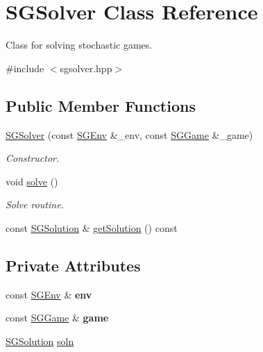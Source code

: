 \hypertarget{classSGSolver}{\section{S\-G\-Solver Class Reference}
\label{classSGSolver}
}


Class for solving stochastic games.  




{\ttfamily \#include $<$sgsolver.\-hpp$>$}

\subsection*{Public Member Functions}
\begin{DoxyCompactItemize}
\item 
\hyperlink{classSGSolver_afb38b33644c2768446f3a247f02dd643}{S\-G\-Solver} (const \hyperlink{classSGEnv}{S\-G\-Env} \&\-\_\-env, const \hyperlink{classSGGame}{S\-G\-Game} \&\-\_\-game)
\begin{DoxyCompactList}\small\item\em Constructor. \end{DoxyCompactList}\item 
void \hyperlink{classSGSolver_a220dd431eabdd9ff8419fafb28b7b990}{solve} ()
\begin{DoxyCompactList}\small\item\em Solve routine. \end{DoxyCompactList}\item 
const \hyperlink{classSGSolution}{S\-G\-Solution} \& \hyperlink{classSGSolver_a6e2e81f9a309bfb2523b98677de99868}{get\-Solution} () const 
\end{DoxyCompactItemize}
\subsection*{Private Attributes}
\begin{DoxyCompactItemize}
\item 
\hypertarget{classSGSolver_a7a4fded3697541a40dbbab06f733e648}{const \hyperlink{classSGEnv}{S\-G\-Env} \& {\bfseries env}}\label{classSGSolver_a7a4fded3697541a40dbbab06f733e648}

\item 
\hypertarget{classSGSolver_ad9b23110fabeeb58f19729017d56c792}{const \hyperlink{classSGGame}{S\-G\-Game} \& {\bfseries game}}\label{classSGSolver_ad9b23110fabeeb58f19729017d56c792}

\item 
\hyperlink{classSGSolution}{S\-G\-Solution} \hyperlink{classSGSolver_ac2b29f9d4f8a5fde16e07c68c349367c}{soln}
\end{DoxyCompactItemize}


